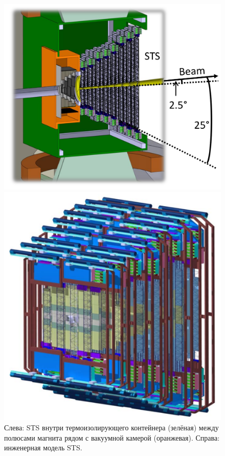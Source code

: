\begin{figure}[H]
\begin{minipage}[b]{0.495\textwidth}
\includegraphics[width=1.0\textwidth]{pictures/STS_1.png}
\end{minipage}
\hspace{0.01\textwidth}
\begin{minipage}[b]{0.495\textwidth}
\includegraphics[width=1.0\textwidth]{pictures/STS_3.png}
\end{minipage}
\caption{Слева: STS внутри термоизолирующего контейнера (зелёная) между полюсами магнита рядом с вакуумной камерой (оранжевая). Справа: инженерная модель STS.}
\label{fig:STS12}
\end{figure}

